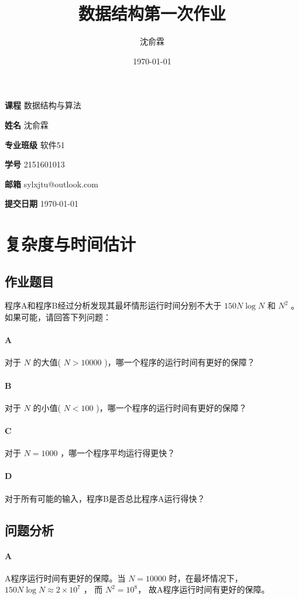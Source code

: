 \documentclass[UTF8]{ctexart}
\title{数据结构第一次作业}
\date{\today}
\author{沈俞霖}
\begin{document}
  \maketitle
  \vspace{100mm}
  \begin{flushright}
  \textbf{课程} 数据结构与算法

  \textbf{姓名} 沈俞霖

  \textbf{专业班级} 软件51

  \textbf{学号} 2151601013

  \textbf{邮箱} sylxjtu@outlook.com

  \textbf{提交日期} \today
  \end{flushright}
  \newpage

  \tableofcontents
  \newpage

  \section{复杂度与时间估计}
    \subsection{作业题目}
      程序A和程序B经过分析发现其最坏情形运行时间分别不大于 $150N\log N$ 和 $N^2$ 。如果可能，请回答下列问题：
      \paragraph{A}
      对于 $N$ 的大值( $N>10000$ )，哪一个程序的运行时间有更好的保障？
      \paragraph{B}
      对于 $N$ 的小值( $N<100$ )，哪一个程序的运行时间有更好的保障？
      \paragraph{C}
      对于 $N=1000$ ，哪一个程序平均运行得更快？
      \paragraph{D}
      对于所有可能的输入，程序B是否总比程序A运行得快？
    \subsection{问题分析}
      \paragraph{A}
      A程序运行时间有更好的保障。当 $N=10000$ 时，在最坏情况下， $ 150 N \log N \approx 2 \times 10 ^ 7 $ ， 而 $ N^2 = 10 ^ 8 $， 故A程序运行时间有更好的保障。
\end{document}
